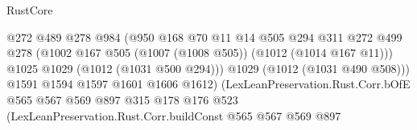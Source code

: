\begin{lexlean}{RustCore}
\begin{coremodule}
                                                  @272
                                                  @489
                                                  @278
                                                  @984
                                                  (@950
                                                    @168
                                                    @70
                                                    @11
                                                    @14
                                                    @505
                                                    @294
                                                    @311
                                                    @272
                                                    @499
                                                    @278
                                                    (@1002
                                                      @167
                                                      @505
                                                      (@1007 (@1008 @505))
                                                      (@1012 (@1014 @167 @11)))
                                                    @1025
                                                    @1029
                                                    (@1012 (@1031 @500 @294)))
                                                  @1029
                                                  (@1012 (@1031 @490 @508)))
                                                @1591
                                                @1594
                                                @1597
                                                @1601
                                                @1606
                                                @1612)
                                              (LexLeanPreservation.Rust.Corr.bOfE
                                                @565
                                                @567
                                                @569
                                                @897
                                                @315
                                                @178
                                                @176
                                                @523
                                                (LexLeanPreservation.Rust.Corr.buildConst
                                                  @565
                                                  @567
                                                  @569
                                                  @897

\end{coremodule}
\end{lexlean}

